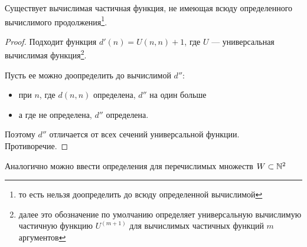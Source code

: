 \begin{thm}
	Существует вычислимая частичная функция, не имеющая всюду определенного вычислимого продолжения\footnote{то есть нельзя доопределить до всюду определенной вычислимой}.
\end{thm}
\begin{proof}
	Подходит функция $ d'(n) = U(n, n) + 1$, где $ U$ --- универсальная вычислимая функция\footnote{далее это обозначение по умолчанию определяет универсальную вычислимую частичную функцию $ U^{(m+1)}$ для вычислимых частичных функций $ m$ аргументов}.

	Пусть ее можно доопределить до вычислимой $ d''$:
	\begin{itemize}
		\item при $ n$, где $ d(n, n) $ определена, $ d''$ на один больше
		\item а где не определена, $ d''$ определена.
	\end{itemize}
	Поэтому $ d''$ отличается от всех сечений универсальной функции. Противоречие. 
\end{proof}


Аналогично можно ввести определения для перечислимых множеств
$ W \subset \mathbb{N}^2$



